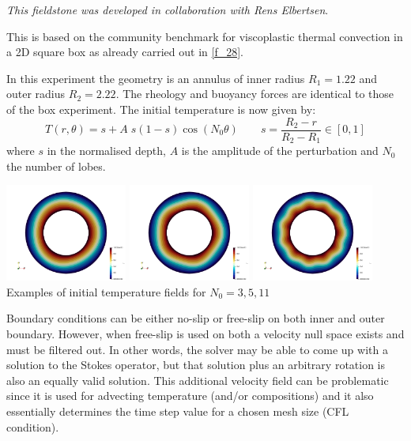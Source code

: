 {\sl This fieldstone was developed in collaboration with Rens Elbertsen}.

This is based on the community benchmark for viscoplastic thermal convection
in a 2D square box \cite{tosn15} as already carried out in \ref{f_28}.

In this experiment the geometry is an annulus of inner radius 
$R_1=1.22$ and outer radius $R_2=2.22$. 
The rheology and buoyancy forces are identical to those of the box 
experiment. The initial temperature is now given by:
\[
T(r,\theta) = s+A\; s(1-s) \cos(N_0 \theta)
\quad\quad s=\frac{R_2-r}{R_2-R_1} \in [0,1]
\]
where $s$ in the normalised depth, $A$ is the amplitude of the perturbation and $N_0$ the 
number of lobes.

\begin{center}
\includegraphics[width=4cm]{python_codes/fieldstone_33/images/T_N03}
\includegraphics[width=4cm]{python_codes/fieldstone_33/images/T_N05}
\includegraphics[width=4cm]{python_codes/fieldstone_33/images/T_N11}\\
{\small Examples of initial temperature fields for $N_0=3,5,11$}
\end{center}

Boundary conditions can be either no-slip or free-slip on both inner and outer boundary. However, when free-slip 
is used on both a velocity null space exists and must be filtered out. In other words,
the solver may be able to come up with a solution to the Stokes operator, but 
that solution plus an arbitrary rotation is also an equally valid solution.
This additional velocity field can be problematic since it is used for advecting temperature (and/or compositions)
and it also essentially determines the time step value for a chosen mesh size (CFL condition).

